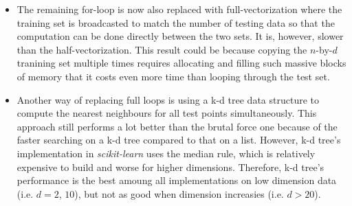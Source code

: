\documentclass{article} %
\begin{document}
\begin{itemize}
  \item The remaining for-loop is now also replaced with full-vectorization where the training set is broadcasted to match the number of testing data so that the computation can be done directly between the two sets. It is, however, slower than the half-vectorization. This result could be because copying the $n$-by-$d$ tranining set multiple times requires allocating and filling such massive blocks of memory that it costs even more time than looping through the test set.

  \item Another way of replacing full loops is using a k-d tree data structure to compute the nearest neighbours for all test points simultaneously. This approach still performs a lot better than the brutal force one because of the faster searching on a k-d tree compared to that on a list. However, k-d tree's implementation in \textit{scikit-learn} uses the median rule, which is relatively expensive to build and worse for higher dimensions. Therefore, k-d tree's performance is the best amoung all implementations on low dimension data (i.e. $d=2$, $10$), but not as good when dimension increasies (i.e. $d>20$).
\end{itemize}



\vspace{0.4cm}
\end{document}
